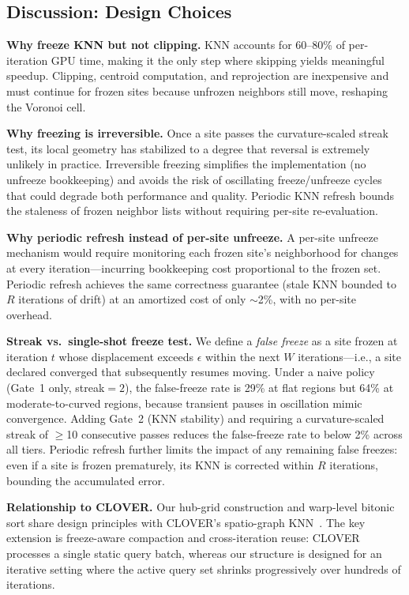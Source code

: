 \subsection{Discussion: Design Choices}
\label{sec:design_choices}

\textbf{Why freeze KNN but not clipping.} KNN accounts for 60--80\% of per-iteration GPU time, making it the only step where skipping yields meaningful speedup. Clipping, centroid computation, and reprojection are inexpensive and must continue for frozen sites because unfrozen neighbors still move, reshaping the Voronoi cell.

\textbf{Why freezing is irreversible.} Once a site passes the curvature-scaled streak test, its local geometry has stabilized to a degree that reversal is extremely unlikely in practice. Irreversible freezing simplifies the implementation (no unfreeze bookkeeping) and avoids the risk of oscillating freeze/unfreeze cycles that could degrade both performance and quality. Periodic KNN refresh bounds the staleness of frozen neighbor lists without requiring per-site re-evaluation.

\textbf{Why periodic refresh instead of per-site unfreeze.} A per-site unfreeze mechanism would require monitoring each frozen site's neighborhood for changes at every iteration---incurring bookkeeping cost proportional to the frozen set. Periodic refresh achieves the same correctness guarantee (stale KNN bounded to $R$ iterations of drift) at an amortized cost of only $\sim$2\%, with no per-site overhead.

\textbf{Streak vs.\ single-shot freeze test.} We define a \emph{false freeze} as a site frozen at iteration $t$ whose displacement exceeds $\epsilon$ within the next $W$ iterations---i.e., a site declared converged that subsequently resumes moving. Under a naive policy (Gate~1 only, streak${}=2$), the false-freeze rate is 29\% at flat regions but 64\% at moderate-to-curved regions, because transient pauses in oscillation mimic convergence. Adding Gate~2 (KNN stability) and requiring a curvature-scaled streak of $\geq$10 consecutive passes reduces the false-freeze rate to below 2\% across all tiers. Periodic refresh further limits the impact of any remaining false freezes: even if a site is frozen prematurely, its KNN is corrected within $R$ iterations, bounding the accumulated error.

\textbf{Relationship to CLOVER.} Our hub-grid construction and warp-level bitonic sort share design principles with CLOVER's spatio-graph KNN~\cite{kamel2025clover}. The key extension is freeze-aware compaction and cross-iteration reuse: CLOVER processes a single static query batch, whereas our structure is designed for an iterative setting where the active query set shrinks progressively over hundreds of iterations.
